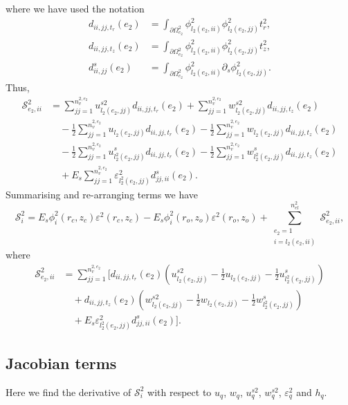 \documentclass{article}
\begin{document}
where we have used the notation
\begin{align}
d_{ii,jj,t_r}(e_2) &= \int_{\partial \Omega_{e_2}^2} \phi_{l_2(e_2,ii)}^2 \phi_{l_2(e_2,jj)}^2 t_r^2, \tag{7.20} \\
d_{ii,jj,t_z}(e_2) &= \int_{\partial \Omega_{e_2}^2} \phi_{l_2(e_2,ii)}^2 \phi_{l_2(e_2,jj)}^2 t_z^2, \tag{7.21} \\
d_{ii,jj}^s(e_2) &= \int_{\partial \Omega_{e_2}^2} \phi_{l_2(e_2,ii)}^2 \partial_s \phi_{l_2(e_2,jj)}^2. \tag{7.22}
\end{align}
Thus,
\begin{align}
\mathcal{S}_{e_2,ii}^2 &= \sum_{jj=1}^{n_v^{2,e_2}} u_{l_2(e_2,jj)}^{s2} d_{ii,jj,t_r}(e_2) + \sum_{jj=1}^{n_v^{2,e_2}} w_{l_2(e_2,jj)}^{s2} d_{ii,jj,t_z}(e_2) \nonumber\\
&\quad - \frac{1}{2} \sum_{jj=1}^{n_v^{2,e_2}} u_{l_2(e_2,jj)} d_{ii,jj,t_r}(e_2) - \frac{1}{2} \sum_{jj=1}^{n_v^{2,e_2}} w_{l_2(e_2,jj)} d_{ii,jj,t_z}(e_2) \nonumber\\
&\quad - \frac{1}{2} \sum_{jj=1}^{n_v^{2,e_2}} u_{l_2^2(e_2,jj)}^s d_{ii,jj,t_r}(e_2) - \frac{1}{2} \sum_{jj=1}^{n_v^{2,e_2}} w_{l_2^2(e_2,jj)}^s d_{ii,jj,t_z}(e_2) \nonumber\\
&\quad + E_s \sum_{jj=1}^{n_v^{2,e_2}} \varepsilon_{l_2^2(e_2,jj)}^2 d_{jj,ii}^s(e_2). \tag{7.21}
\end{align}
Summarising and re-arranging terms we have
\begin{equation}
\mathcal{S}_i^2 = E_s \phi_i^2(r_c,z_c) \varepsilon^2(r_c,z_c) - E_s \phi_i^2(r_o,z_o) \varepsilon^2(r_o,z_o) + \sum_{\substack{e_2=1\\ i=l_2(e_2,ii)}}^{n_{el}^2} \mathcal{S}_{e_2,ii}^2, \tag{7.22}
\end{equation}
where
\begin{align}
\mathcal{S}_{e_2,ii}^2 &= \sum_{jj=1}^{n_v^{2,e_2}} \Bigg[ d_{ii,jj,t_r}(e_2) \left( u_{l_2(e_2,jj)}^{s2} - \frac{1}{2} u_{l_2(e_2,jj)} - \frac{1}{2} u_{l_2^2(e_2,jj)}^s \right) \nonumber\\
&\quad + d_{ii,jj,t_z}(e_2) \left( w_{l_2(e_2,jj)}^{s2} - \frac{1}{2} w_{l_2(e_2,jj)} - \frac{1}{2} w_{l_2^2(e_2,jj)}^s \right) \nonumber\\
&\quad + E_s \varepsilon_{l_2^2(e_2,jj)}^2 d_{jj,ii}^s(e_2) \Bigg]. \tag{7.23}
\end{align}

\subsection{Jacobian terms} %
Here we find the derivative of $\mathcal{S}_i^2$ with respect to $u_q$, $w_q$, $u_q^{s2}$, $w_q^{s2}$, $\varepsilon_q^2$ and $h_q$.
\end{document}
